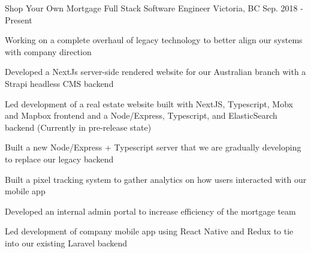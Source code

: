 \begin{cventries}
\cventry
{Shop Your Own Mortgage} %
{Full Stack Software Engineer} %
{Victoria, BC} %
{Sep. 2018 - Present} %
{ %
\begin{cvitems}
\item {Working on a complete overhaul of legacy technology to better align our systems with company direction}
\item {Developed a NextJs server-side rendered website for our Australian branch with a Strapi headless CMS backend}
\item {Led development of a real estate website built with NextJS, Typescript, Mobx and Mapbox frontend and a Node/Express, Typescript, and ElasticSearch backend (Currently in pre-release state)}
\item {Built a new Node/Express + Typescript server that we are gradually developing to replace our legacy backend}
\item {Built a pixel tracking system to gather analytics on how users interacted with our mobile app}
\item {Developed an internal admin portal to increase efficiency of the mortgage team}
\item {Led development of company mobile app using React Native and Redux to tie into our existing Laravel backend}
\end{cvitems}
}

\end{cventries}
